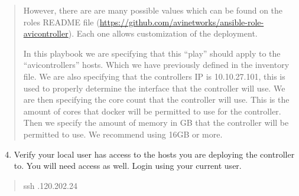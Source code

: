 \documentclass[letterpaper,10pt,english]{sphinxmanual}
\begin{document}
\begin{quote}

\begin{sphinxVerbatim}[commandchars=\\\{\}]
  
   
      
       
       
       
\end{sphinxVerbatim}

However, there are are many possible values which can be found on the roles README file (\url{https://github.com/avinetworks/ansible-role-avicontroller}). Each one allows customization of the deployment.

In this playbook we are specifying that this ``play'' should apply to the ``avicontrollers'' hosts. Which we have previously defined in the inventory file. We are also specifying that the controllers IP is 10.10.27.101, this is used to properly determine the interface that the controller will use. We are then specifying the core count that the controller will use. This is the amount of cores that docker will be permitted to use for the controller. Then we specify the amount of memory in GB that the controller will be permitted to use. We recommend using 16GB or more.
\end{quote}
\begin{enumerate}
\setcounter{enumi}{3}
\item {} 
Verify your local user has access to the hosts you are deploying the controller to. You will need  access as well. Login using your current user.

\end{enumerate}
\begin{quote}

\begin{sphinxVerbatim}[commandchars=\\\{\}]
ssh .120.202.24
\end{sphinxVerbatim}
\end{quote}
\end{document}

